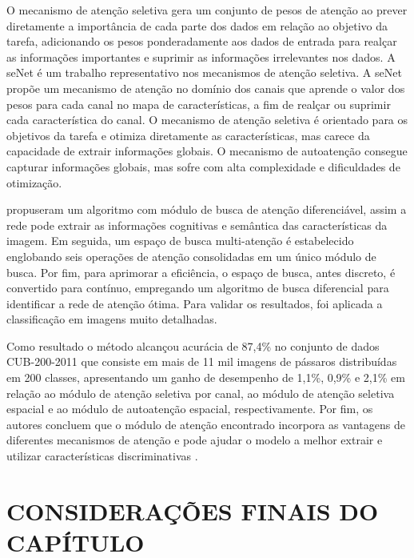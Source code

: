 O mecanismo de atenção seletiva gera um conjunto de pesos de atenção ao prever diretamente a importância de cada parte dos dados em relação ao objetivo da tarefa, adicionando os pesos ponderadamente aos dados de entrada para realçar as informações importantes e suprimir as informações irrelevantes nos dados. A \gls{se}Net é um trabalho representativo nos mecanismos de atenção seletiva. A \gls{se}Net propõe um mecanismo de atenção no domínio dos canais que aprende o valor dos pesos para cada canal no mapa de características, a fim de realçar ou suprimir cada característica do canal. O mecanismo de atenção seletiva é orientado para os objetivos da tarefa e otimiza diretamente as características, mas carece da capacidade de extrair informações globais. O mecanismo de autoatenção consegue capturar informações globais, mas sofre com alta complexidade e dificuldades de otimização. 

 propuseram um algoritmo com módulo de busca de atenção diferenciável, assim a rede pode extrair as informações cognitivas e semântica das características da imagem. Em seguida, um espaço de busca multi-atenção é estabelecido englobando seis operações de atenção consolidadas em um único módulo de busca. Por fim, para aprimorar a eficiência, o espaço de busca, antes discreto, é convertido para contínuo, empregando um algoritmo de busca diferencial para identificar a rede de atenção ótima. Para validar os resultados, foi aplicada a classificação em imagens  muito detalhadas. 

Como resultado o método alcançou acurácia de 87,4\% no conjunto de dados CUB-200-2011 que consiste em mais de 11 mil imagens de pássaros distribuídas em 200 classes, apresentando um ganho de desempenho de 1,1\%, 0,9\% e 2,1\% em relação ao módulo de atenção seletiva por canal, ao módulo de atenção seletiva espacial e ao módulo de autoatenção espacial, respectivamente. Por fim, os autores concluem que o módulo de atenção encontrado incorpora as vantagens de diferentes mecanismos de atenção e pode ajudar o modelo a melhor extrair e utilizar características discriminativas \cite{yangNeuralNetworkDesign2024a}.

\section{CONSIDERAÇÕES FINAIS DO CAPÍTULO}
\label{sec:consideracoes_finais}

